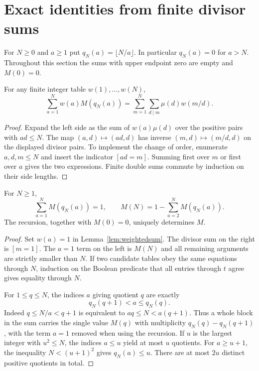 \section{Exact identities from finite divisor sums}\label{sec:divisor-identities}
For $N\ge 0$ and $a\ge1$ put $q_N(a)=\lfloor N/a\rfloor$.
In particular $q_N(a)=0$ for $a>N$. Throughout this section the sums
with upper endpoint zero are empty and $M(0)=0$.

\begin{lemma}\label{lem:weightedsum}
For any finite integer table $w(1),\ldots,w(N)$,
\[
 \sum_{a=1}^{N} w(a)M(q_N(a))
 =\sum_{m=1}^{N}\sum_{d\mid m}\mu(d)w(m/d).
\]
\end{lemma}
\begin{proof}
Expand the left side as the sum of $w(a)\mu(d)$ over the positive pairs
with $ad\le N$. The map $(a,d)\longmapsto(ad,d)$ has inverse
$(m,d)\longmapsto(m/d,d)$ on the displayed divisor pairs. To implement
the change of order, enumerate $a,d,m\le N$ and insert the indicator
$[ad=m]$. Summing first over $m$ or first over $a$ gives the two
expressions. Finite double sums commute by induction on their side lengths.
\end{proof}

\begin{theorem}\label{thm:floor-recurrence}
For $N\ge1$,
\[
 \sum_{a=1}^{N}M(q_N(a))=1,\qquad
 M(N)=1-\sum_{a=2}^{N}M(q_N(a)).
\]
The recursion, together with $M(0)=0$, uniquely determines $M$.
\end{theorem}
\begin{proof}
Set $w(a)=1$ in Lemma~\ref{lem:weightedsum}. The divisor sum on the right
is $[m=1]$. The $a=1$ term on the left is $M(N)$ and all remaining
arguments are strictly smaller than $N$. If two candidate tables obey the
same equations through $N$, induction on the Boolean predicate that all
entries through $t$ agree gives equality through $N$.

For $1\le q\le N$, the indices $a$ giving quotient $q$ are exactly
\[
  q_N(q+1)<a\le q_N(q).
\]
Indeed $q\le N/a<q+1$ is equivalent to $a q\le N<a(q+1)$.
Thus a whole block in the sum carries the single value $M(q)$ with
multiplicity $q_N(q)-q_N(q+1)$, with the term $a=1$ removed when using
the recursion. If $u$ is the largest integer with $u^2\le N$, the
indices $a\le u$ yield at most $u$ quotients. For $a\ge u+1$, the
inequality $N<(u+1)^2$ gives $q_N(a)\le u$. There are at most $2u$
distinct positive quotients in total.
\end{proof}

